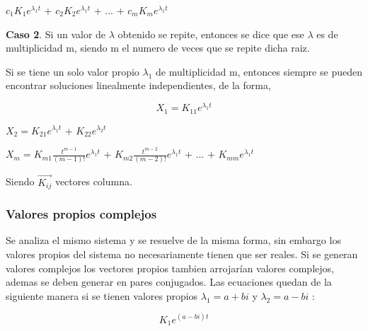 \documentclass[titlepage]{article}
\begin{document}
                    \begin{center}
                        $c_1K_1e^{\lambda_1t}$ + $c_2K_2e^{\lambda_1t}$ + ... + $c_mK_me^{\lambda_1t}$
                    \end{center}
                    
                \textbf{Caso 2}.  Si un valor de $\lambda$ obtenido se repite, entonces se dice que ese $\lambda$ es de multiplicidad m, siendo m el numero de veces que se repite dicha raiz.\par
                Si se tiene un solo valor propio $\lambda_1$ de multiplicidad m, entonces siempre se pueden encontrar soluciones linealmente independientes, de la forma,
                    
                    \begin{equation*}
                        X_1 = K_{11}e^{\lambda_1t}
                    \end{equation*}
                    \begin{center}
                        $X_2 = K_{21}e^{\lambda_1t}$ +  $K_{22}e^{\lambda_2t}
                        $\par\vspace{0.3cm}
                        $X_m = K_{m1} \frac{t^{m-1}}{(m-1)!} e^{\lambda_1t}$ +  $K_{m2} \frac{t^{m-2}}{(m-2)!} e^{\lambda_1t} $ + ... + $K_{mm} e^{\lambda_1t} $
                    \end{center}
                    
                Siendo $\vec{K_{ij}}$ vectores columna. \cite{Zill2002b}
            
            \subsubsection{Valores propios complejos}
            
                Se analiza el mismo sistema y se resuelve de la misma forma, sin embargo los valores propios del sistema no necesariamente tienen que ser reales. Si se generan valores complejos los vectores propios tambien arrojarían valores complejos, ademas se deben generar en pares conjugados. Las ecuaciones quedan de la siguiente manera si se tienen valores propios $\lambda_1 = a + bi $ y $\lambda_2 = a - bi $ :
                
                \begin{equation*}
                    K_1e^{(a-bi)t}  
                \end{equation*}
            
\end{document}
